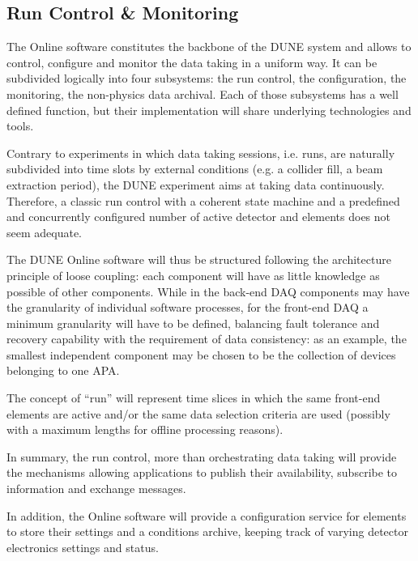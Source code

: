 
\subsection{Run Control \& Monitoring}
\label{sec:fd-daq-tcm}



The Online software constitutes the backbone of the DUNE 
system and allows to control, configure and monitor the data taking in
a uniform way.
It can be subdivided logically into four subsystems: the run control,
the configuration, the monitoring, the non-physics data archival.
Each of those subsystems has a well defined function, but their
implementation will share underlying technologies and tools.

Contrary to experiments in which data taking sessions, i.e. runs, are
naturally subdivided into time slots by external conditions (e.g. a
collider fill, a beam extraction period), the DUNE experiment aims at
taking data continuously.
Therefore, a classic run control with a coherent state machine and a
predefined and concurrently configured number of active detector and
 elements does not seem adequate. 

The DUNE Online software will thus be structured following the
architecture principle of loose coupling: each component will have as
little knowledge as possible of other components.
While in the back-end DAQ components may have the granularity of
individual software processes, for the front-end DAQ a minimum
granularity will have to be defined, balancing fault tolerance and
recovery capability with the requirement of data consistency: as an
example, the smallest independent component may be chosen to be the
collection of devices belonging to one APA.

The concept of ``run'' will represent time slices in which the same
front-end elements are active and/or the same data selection criteria
are used (possibly with a maximum lengths for offline processing
reasons). 

In summary, the run control, more than orchestrating data taking will
provide the mechanisms allowing  applications to publish
their availability, subscribe to information and exchange messages. 

In addition, the Online software will provide a configuration service
for  elements to store their settings and a conditions
archive, keeping track of varying detector electronics settings and
status.

